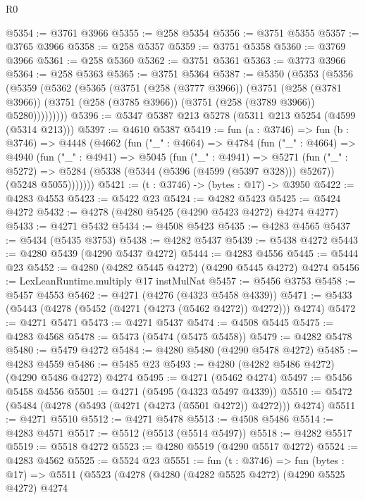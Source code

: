 \begin{lexlean}{R0}
\begin{coremodule}
@5354 := @3761 @3966
@5355 := @258 @5354
@5356 := @3751 @5355
@5357 := @3765 @3966
@5358 := @258 @5357
@5359 := @3751 @5358
@5360 := @3769 @3966
@5361 := @258 @5360
@5362 := @3751 @5361
@5363 := @3773 @3966
@5364 := @258 @5363
@5365 := @3751 @5364
@5387 := @5350
    (@5353
      (@5356
        (@5359
          (@5362
            (@5365
              (@3751
                (@258 (@3777 @3966))
                (@3751
                  (@258 (@3781 @3966))
                  (@3751 (@258 (@3785 @3966)) (@3751 (@258 (@3789 @3966)) @5280)))))))))
@5396 := @5347 @5387 @213 @5278 (@5311 @213 @5254 (@4599 (@5314 @213)))
@5397 := @4610 @5387
@5419 := fun (a : @3746) =>
  fun (b : @3746) =>
  @4448
    (@4662
      (fun ("_" : @4664) =>
      @4784
        (fun ("_" : @4664) =>
        @4940
          (fun ("_" : @4941) =>
          @5045
            (fun ("_" : @4941) =>
            @5271
              (fun ("_" : @5272) =>
              @5284 (@5338 (@5344 (@5396 (@4599 (@5397 @328))) @5267)) (@5248 @5055)))))))
@5421 := (t : @3746) -> (bytes : @17) -> @3950
@5422 := @4283 @4553
@5423 := @5422 @23
@5424 := @4282 @5423
@5425 := @5424 @4272
@5432 := @4278 (@4280 @5425 (@4290 @5423 @4272) @4274 @4277)
@5433 := @4271 @5432
@5434 := @4508 @5423
@5435 := @4283 @4565
@5437 := @5434 (@5435 @3753)
@5438 := @4282 @5437
@5439 := @5438 @4272
@5443 := @4280 @5439 (@4290 @5437 @4272)
@5444 := @4283 @4556
@5445 := @5444 @23
@5452 := @4280 (@4282 @5445 @4272) (@4290 @5445 @4272) @4274
@5456 := LexLeanRuntime.multiply @17 instMulNat
@5457 := @5456 @3753
@5458 := @5457 @4553
@5462 := @4271 (@4276 (@4323 @5458 @4339))
@5471 := @5433 (@5443 (@4278 (@5452 (@4271 (@4273 (@5462 @4272)) @4272))) @4274)
@5472 := @4271 @5471
@5473 := @4271 @5437
@5474 := @4508 @5445
@5475 := @4283 @4568
@5478 := @5473 (@5474 (@5475 @5458))
@5479 := @4282 @5478
@5480 := @5479 @4272
@5484 := @4280 @5480 (@4290 @5478 @4272)
@5485 := @4283 @4559
@5486 := @5485 @23
@5493 := @4280 (@4282 @5486 @4272) (@4290 @5486 @4272) @4274
@5495 := @4271 (@5462 @4274)
@5497 := @5456 @5458 @4556
@5501 := @4271 (@5495 (@4323 @5497 @4339))
@5510 := @5472 (@5484 (@4278 (@5493 (@4271 (@4273 (@5501 @4272)) @4272))) @4274)
@5511 := @4271 @5510
@5512 := @4271 @5478
@5513 := @4508 @5486
@5514 := @4283 @4571
@5517 := @5512 (@5513 (@5514 @5497))
@5518 := @4282 @5517
@5519 := @5518 @4272
@5523 := @4280 @5519 (@4290 @5517 @4272)
@5524 := @4283 @4562
@5525 := @5524 @23
@5551 := fun (t : @3746) =>
  fun (bytes : @17) =>
  @5511
    (@5523
      (@4278
        (@4280
          (@4282 @5525 @4272)
          (@4290 @5525 @4272)
          @4274

\end{coremodule}
\end{lexlean}
